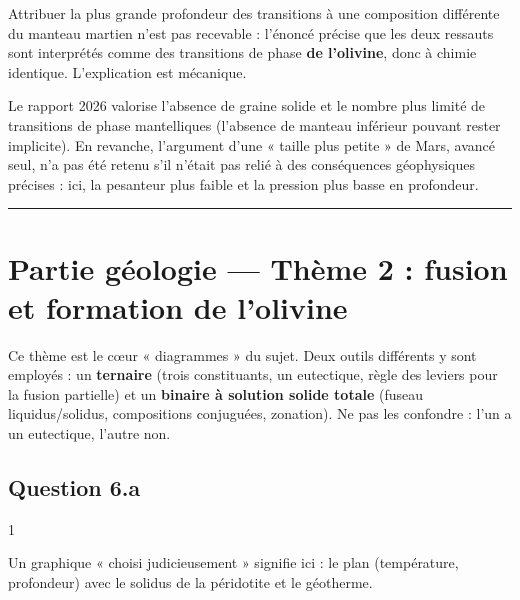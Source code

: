 \documentclass[11pt,a4paper]{article}
\begin{document}
\begin{piege}

Attribuer la plus grande profondeur des transitions à une composition différente du manteau martien n'est pas recevable : l'énoncé précise que les deux ressauts sont interprétés comme des transitions de phase \textbf{de l'olivine}, donc à chimie identique. L'explication est mécanique.

\end{piege}

\begin{jury}

Le rapport 2026 valorise l'absence de graine solide et le nombre plus limité de transitions de phase mantelliques (l'absence de manteau inférieur pouvant rester implicite). En revanche, l'argument d'une « taille plus petite » de Mars, avancé seul, n'a pas été retenu s'il n'était pas relié à des conséquences géophysiques précises : ici, la pesanteur plus faible et la pression plus basse en profondeur.

\end{jury}

\begin{center}\rule{0.5\linewidth}{0.5pt}\end{center}

\hypertarget{partie-guxe9ologie-thuxe8me-2-fusion-et-formation-de-lolivine}{%
\section{Partie géologie --- Thème 2 : fusion et formation de l'olivine}\label{partie-guxe9ologie-thuxe8me-2-fusion-et-formation-de-lolivine}}

Ce thème est le cœur « diagrammes » du sujet. Deux outils différents y sont employés : un \textbf{ternaire} (trois constituants, un eutectique, règle des leviers pour la fusion partielle) et un \textbf{binaire à solution solide totale} (fuseau liquidus/solidus, compositions conjuguées, zonation). Ne pas les confondre : l'un a un eutectique, l'autre non.

\hypertarget{question-6.a}{%
\subsection{Question 6.a}\label{question-6.a}}

\begin{indication}{1}

Un graphique « choisi judicieusement » signifie ici : le plan (température, profondeur) avec le solidus de la péridotite et le géotherme.

\end{indication}
\end{document}
